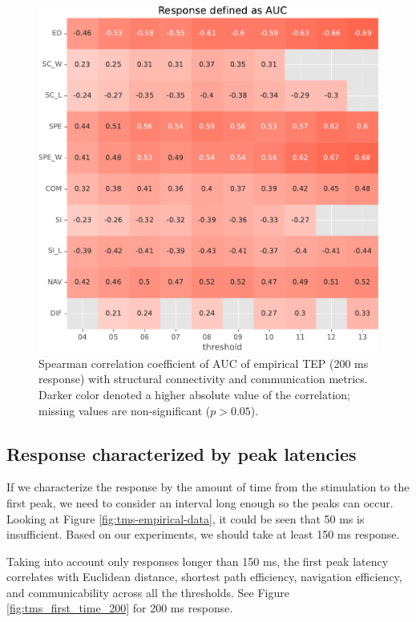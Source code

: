 \begin{figure}
    \centering
    \includegraphics[width=\textwidth]{images/nootebook_generated/tmseeg_results/empirical/200/not_over_threshold_nan/Response defined as AUC.pdf}
    \caption[TEPs AUC (200 ms) correlations]{Spearman correlation coefficient of AUC of empirical TEP (200 ms response) with structural connectivity and communication metrics. Darker color denoted a higher absolute value of the correlation; missing values are non-significant ($p>0.05$).}
    \label{fig:tms_auc_200}
\end{figure}

\subsection{Response characterized by peak latencies}

If we characterize the response by the amount of time from the stimulation to the first peak, we need to consider an interval long enough so the peaks can occur. Looking at Figure \ref{fig:tms-empirical-data}, it could be seen that 50 ms is insufficient. Based on our experiments, we should take at least 150 ms response. 

Taking into account only responses longer than 150 ms, the first peak latency correlates with Euclidean distance, shortest path efficiency, navigation efficiency, and communicability across all the thresholds. See Figure \ref{fig:tms_first_time_200} for 200 ms response.

